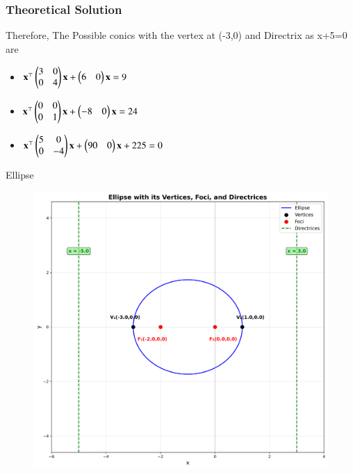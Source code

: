 \documentclass{beamer}
\begin{document}
\begin{frame}[fragile]
    \frametitle{Theoretical Solution}
Therefore, The Possible conics with the vertex at (-3,0) and Directrix as x+5=0 are\\
\begin{itemize}
\item$\mathbf{x}^\top\begin{pmatrix}3 & 0 \\ 0 & 4\end{pmatrix}\mathbf{x} + \begin{pmatrix}6 & 0\end{pmatrix}\mathbf{x} = 9$
\item$\mathbf{x}^\top\begin{pmatrix}0 & 0 \\ 0 & 1\end{pmatrix}\mathbf{x} + \begin{pmatrix}-8 & 0\end{pmatrix}\mathbf{x} = 24$
\item$\mathbf{x}^\top\begin{pmatrix}5 & 0 \\ 0 & -4\end{pmatrix}\mathbf{x} + \begin{pmatrix}90 & 0\end{pmatrix}\mathbf{x} + 225 = 0$
\end{itemize}
\end{frame}


\begin{frame}{Ellipse}
\begin{figure}
   \centering
    \includegraphics[width=\columnwidth, height=0.8\textheight, keepaspectratio]{figs/fig1.png}
    \label{fig:Beamer/figs/fig1.png}
\end{figure}
\end{frame}
\end{document}
